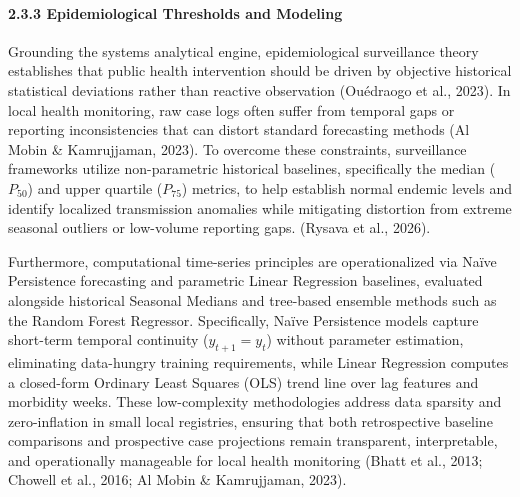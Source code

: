 \documentclass[
]{article}
\begin{document}
\paragraph{}\label{section-2}

\paragraph{}\label{section-3}

\paragraph{\texorpdfstring{\textbf{2.3.3 Epidemiological Thresholds and
Modeling}
}{2.3.3 Epidemiological Thresholds and Modeling }}\label{epidemiological-thresholds-and-modeling}

Grounding the system\textquotesingle s analytical engine,
epidemiological surveillance theory establishes that public health
intervention should be driven by objective historical statistical
deviations rather than reactive observation (Ouédraogo et al., 2023). In
local health monitoring, raw case logs often suffer from temporal gaps
or reporting inconsistencies that can distort standard forecasting
methods (Al Mobin \& Kamrujjaman, 2023). To overcome these constraints,
surveillance frameworks utilize non-parametric historical baselines,
specifically the median (\(P_{50}\)) and upper quartile (\(P_{75}\))
metrics, to help establish normal endemic levels and identify localized
transmission anomalies while mitigating distortion from extreme seasonal
outliers or low-volume reporting gaps. (Rysava et al., 2026).

Furthermore, computational time-series principles are operationalized
via Naïve Persistence forecasting and parametric Linear Regression
baselines, evaluated alongside historical Seasonal Medians and
tree-based ensemble methods such as the Random Forest Regressor.
Specifically, Naïve Persistence models capture short-term temporal
continuity (\(y_{t + 1} = y_{t}\)) without parameter estimation,
eliminating data-hungry training requirements, while Linear Regression
computes a closed-form Ordinary Least Squares (OLS) trend line over lag
features and morbidity weeks. These low-complexity methodologies address
data sparsity and zero-inflation in small local registries, ensuring
that both retrospective baseline comparisons and prospective case
projections remain transparent, interpretable, and operationally
manageable for local health monitoring (Bhatt et al., 2013; Chowell et
al., 2016; Al Mobin \& Kamrujjaman, 2023).
\end{document}
